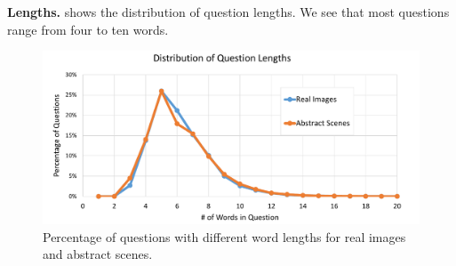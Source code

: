 \textbf{Lengths.}
 shows the distribution of question lengths.
We see that most questions range from four to ten words.

\begin{figure}[t]
\centering
\includegraphics[width=1\linewidth]{figures/Lengths.pdf}
\caption{Percentage of questions with different word lengths for real images and abstract scenes.}
\label{fig:QuesLen}
\end{figure}




